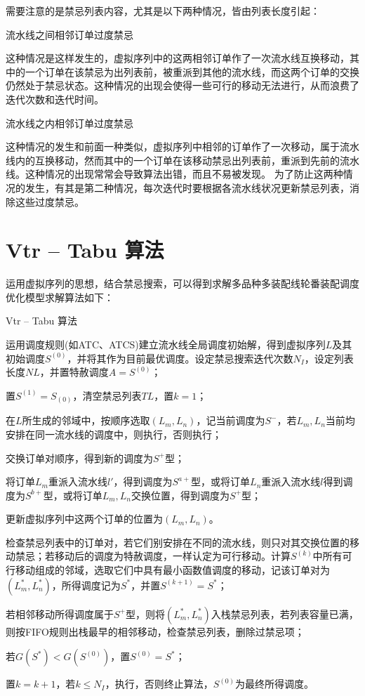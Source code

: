 需要注意的是禁忌列表内容，尤其是以下两种情况，皆由列表长度引起：
\begin{asparaenum}
\item 流水线之间相邻订单过度禁忌

这种情况是这样发生的，虚拟序列中的这两相邻订单作了一次流水线互换移动，其中的一个订单在该禁忌为出列表前，被重派到其他的流水线，而这两个订单的交换仍然处于禁忌状态。这种情况的出现会使得一些可行的移动无法进行，从而浪费了迭代次数和迭代时间。
\item 流水线之内相邻订单过度禁忌
\end{asparaenum}
这种情况的发生和前面一种类似，虚拟序列中相邻的订单作了一次移动，属于流水线内的互换移动，然而其中的一个订单在该移动禁忌出列表前，重派到先前的流水线。这种情况的出现常常会导致算法出错，而且不易被发现。
为了防止这两种情况的发生，有其是第二种情况，每次迭代时要根据各流水线状况更新禁忌列表，消除这些过度禁忌。
\section{Vtr -- Tabu 算法}
运用虚拟序列的思想，结合禁忌搜索，可以得到求解多品种多装配线轮番装配调度优化模型求解算法如下：
\begin{algori}
Vtr -- Tabu 算法\label{alg:vtrtabu}
\begin{asparaenum}
\renewcommand{\labelenumi}{\bf Step\theenumi~}
\item 运用调度规则(如ATC、ATCS)建立流水线全局调度初始解，得到虚拟序列$L$及其初始调度$S^{(0)}$，并将其作为目前最优调度。设定禁忌搜索迭代次数$N_I$，设定列表长度$NL$，并置特赦调度$A = S^{(0)}$；
\item 置$S^{(1)} = S_{(0)}$，清空禁忌列表$TL$，置$k = 1$；
\item 在$L$所生成的邻域中，按顺序选取$(L_m, L_n)$，记当前调度为$S^-$，若$L_m, L_n$当前均安排在同一流水线的调度中，则执行，否则执行；
\item 交换订单对顺序，得到新的调度为$S^+$型；
\item 将订单$L_m$重派入流水线$l'$，得到调度为$S^{a+}$型，或将订单$L_n$重派入流水线$l$得到调度为$S^{b+}$型，或将订单$L_m, L_n$交换位置，得到调度为$S^+$型；
\item 更新虚拟序列中这两个订单的位置为$(L_m, L_n)$。
\item 检查禁忌列表中的订单对，若它们别安排在不同的流水线，则只对其交换位置的移动禁忌；若移动后的调度为特赦调度，一样认定为可行移动。计算$S^{(k)}$中所有可行移动组成的邻域，选取它们中具有最小函数值调度的移动，记该订单对为$(L_m^*, L_n^*)$，所得调度记为$S^*$，并置$S^{(k+1)} = S^*$；
\item 若相邻移动所得调度属于$S^+$型，则将$(L_m^*, L_n^*)$入栈禁忌列表，若列表容量已满，则按FIFO规则出栈最早的相邻移动，检查禁忌列表，删除过禁忌项；
\item 若$G(S^*) < G(S^{(0)})$，置$S^{(0)} = S^*$；
\item 置$k = k + 1$，若$k\le N_I$，执行，否则终止算法，$S^{(0)}$为最终所得调度。
\end{asparaenum}
\end{algori}

